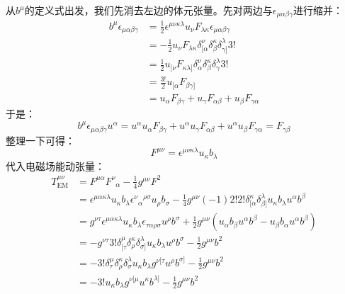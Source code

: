 \documentclass[lang=cn,color=blue,cm,11pt,scheme=chinese,bibend=bibtex,sorting=nty]{elegantbook}
\begin{document}
\begin{note}
		从$b^{\mu}$的定义式出发，我们先消去左边的体元张量。先对两边与$\epsilon_{\mu \alpha \beta \gamma}$进行缩并：
		\begin{align*}
			b^{\mu} \epsilon_{\mu \alpha \beta \gamma} & = \frac{1}{2} \epsilon^{\mu \nu \kappa \lambda} u_{\nu} F_{\lambda \kappa} \epsilon_{\mu \alpha \beta \gamma}\\
			& = - \frac{1}{2} u_{\nu} F_{\lambda \kappa} \delta^{\nu}_{[\alpha} \delta^{\kappa}_{\beta} \delta^{\lambda}_{\gamma]} 3!\\
			& = \frac{1}{2} u_{[\nu} F_{\kappa \lambda]} \delta^{\nu}_{\alpha} \delta^{\kappa}_{\beta} \delta^{\lambda}_{\gamma} 3!\\
			& = \frac{3!}{2} u_{[\alpha} F_{\beta \gamma]}\\
			& = u_{\alpha} F_{\beta \gamma} + u_{\gamma} F_{\alpha \beta} + u_{\beta} F_{\gamma \alpha}
		\end{align*}
		于是：
		\[ b^{\mu} \epsilon_{\mu \alpha \beta \gamma} u^{\alpha} = u^{\alpha} u_{\alpha} F_{\beta \gamma} + u^{\alpha} u_{\gamma} F_{\alpha \beta} + u^{\alpha} u_{\beta} F_{\gamma \alpha} = F_{\gamma \beta} \]
		整理一下可得：
		\[ F^{\mu \nu} = \epsilon^{\mu \nu \kappa \lambda} u_{\kappa} b_{\lambda} \]
		代入电磁场能动张量：
		\begin{align*}
			T_{\text{EM}}^{\mu \nu} & = F^{\mu \alpha} F^{\nu}{}_{\alpha} - \frac{1}{4} g^{\mu \nu} F^2\\
			& = \epsilon^{\mu \alpha \kappa \lambda} u_{\kappa} b_{\lambda} \epsilon^{\nu}{}_{\alpha}{}^{\rho \sigma} u_{\rho} b_{\sigma} - \frac{1}{4} g^{\mu \nu} (- 1) 2! 2! \delta^{\kappa}_{[\alpha} \delta^{\lambda}_{\beta]} u_{\kappa} b_{\lambda} u^{\alpha} b^{\beta}\\
			& = g^{\nu \tau} \epsilon^{\mu \alpha \kappa \lambda} u_{\kappa} b_{\lambda} \epsilon_{\tau \alpha \rho \sigma} u^{\rho} b^{\sigma} + \frac{1}{2} g^{\mu \nu} (u_{\alpha} b_{\beta} u^{\alpha} b^{\beta} - u_{\beta} b_{\alpha} u^{\alpha} b^{\beta})\\
			& = - g^{\nu \tau} 3! \delta^{\mu}_{[\tau} \delta^{\kappa}_{\rho} \delta^{\lambda}_{\sigma]} u_{\kappa} b_{\lambda} u^{\rho} b^{\sigma} - \frac{1}{2} g^{\mu \nu} b^2\\
			& = - 3! \delta^{\mu}_{\tau} \delta^{\kappa}_{\rho} \delta^{\lambda}_{\sigma} u_{\kappa} b_{\lambda} g^{\nu [\tau} u^{\rho} b^{\sigma]} - \frac{1}{2} g^{\mu \nu} b^2\\
			& = - 3! u_{\kappa} b_{\lambda} g^{\nu [\mu} u^{\kappa} b^{\lambda]} - \frac{1}{2} g^{\mu \nu} b^2\\

\end{align*}
\end{note}
\end{document}
